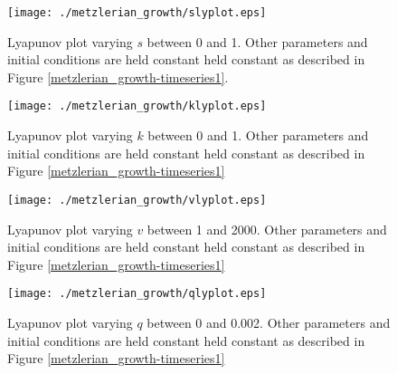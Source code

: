 \begin{figure}
    \centering
    \texttt{[image: ./metzlerian\_growth/slyplot.eps]}
    \caption{Lyapunov plot varying $s$ between 0 and 1. Other parameters and initial conditions are held constant held constant as described in Figure \ref{metzlerian_growth-timeseries1}.}
    \label{metzlerian_growth-sLyapunov}
\end{figure}
\begin{figure}
    \centering
    \texttt{[image: ./metzlerian\_growth/klyplot.eps]}
    \caption{Lyapunov plot varying $k$ between 0 and 1. Other parameters and initial conditions are held constant held constant as described in Figure \ref{metzlerian_growth-timeseries1}}
    \label{metzlerian_growth-kLyapunov}
\end{figure}
\begin{figure}
    \centering
    \texttt{[image: ./metzlerian\_growth/vlyplot.eps]}
    \caption{Lyapunov plot varying $v$ between 1 and 2000. Other parameters and initial conditions are held constant held constant as described in Figure \ref{metzlerian_growth-timeseries1}}
    \label{metzlerian_growth-vLyapunov}
\end{figure}
\begin{figure}
    \centering
    \texttt{[image: ./metzlerian\_growth/qlyplot.eps]}
    \caption{Lyapunov plot varying $q$ between 0 and 0.002. Other parameters and initial conditions are held constant held constant as described in Figure \ref{metzlerian_growth-timeseries1}}
    \label{metzlerian_growth-qLyapunov}
\end{figure}


